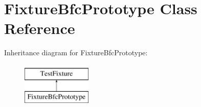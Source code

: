 \hypertarget{classFixtureBfcPrototype}{\section{Fixture\-Bfc\-Prototype Class Reference}
\label{classFixtureBfcPrototype}
}
Inheritance diagram for Fixture\-Bfc\-Prototype\-:\begin{figure}[H]
\begin{center}
\leavevmode
\includegraphics[height=2.000000cm]{classFixtureBfcPrototype}
\end{center}
\end{figure}
